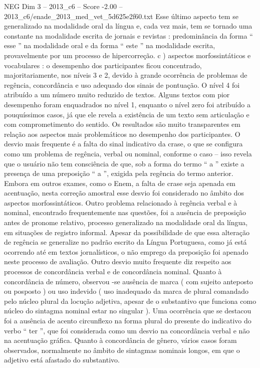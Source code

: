 \begin{textsample}{NEG Dim 3 – 2013\_c6 – Score -2.00 – 2013\_c6/enade\_2013\_med\_vet\_5d625e2f60.txt}
Esse último aspecto tem se generalizado na modalidade oral da língua e, cada vez mais, tem se tornado uma constante na modalidade escrita de jornais e revistas : predominância da forma “ esse ” na modalidade oral e da forma “ este ” na modalidade escrita, provavelmente por um processo de hipercorreção. c ) aspectos morfossintáticos e vocabulares : o desempenho dos participantes ficou concentrado, majoritariamente, nos níveis 3 e 2, devido à grande ocorrência de problemas de regência, concordância e uso adequado dos sinais de pontuação.
O nível 4 foi atribuído a um número muito reduzido de textos.
Alguns textos com pior desempenho foram enquadrados no nível 1, enquanto o nível zero foi atribuído a pouquíssimos casos, já que ele revela a existência de um texto sem articulação e com comprometimento do sentido.
Os resultados são muito transparentes em relação aos aspectos mais problemáticos no desempenho dos participantes.
O desvio mais frequente é a falta do sinal indicativo da crase, o que se configura como um problema de regência, verbal ou nominal, conforme o caso – isso revela que o usuário não tem consciência de que, sob a forma do termo “ a ” existe a presença de uma preposição “ a ”, exigida pela regência do termo anterior.
Embora em outros exames, como o Enem, a falta de crase seja apenada em acentuação, nesta correção amostral esse desvio foi considerado no âmbito dos aspectos morfossintáticos.
Outro problema relacionado à regência verbal e à nominal, encontrado frequentemente nas questões, foi a ausência de preposição antes de pronome relativo, processo generalizado na modalidade oral da língua, em situações de registro informal.
Apesar da possibilidade de que essa alteração de regência se generalize no padrão escrito da Língua Portuguesa, como já está ocorrendo até em textos jornalísticos, o não emprego da preposição foi apenado neste processo de avaliação.
Outro desvio muito frequente diz respeito aos processos de concordância verbal e de concordância nominal.
Quanto à concordância de número, observou -se ausência de marca ( com sujeito anteposto ou posposto ) ou uso indevido ( uso inadequado da marca de plural comandado pelo núcleo plural da locução adjetiva, apesar de o substantivo que funciona como núcleo do sintagma nominal estar no singular ).
Uma ocorrência que se destacou foi a ausência de acento circunflexo na forma plural do presente do indicativo do verbo “ ter ”, que foi considerada como um desvio na concordância verbal e não na acentuação gráfica.
Quanto à concordância de gênero, vários casos foram observados, normalmente no âmbito de sintagmas nominais longos, em que o adjetivo está afastado do substantivo.

\end{textsample}
